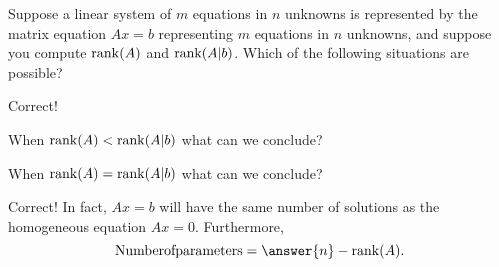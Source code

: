\documentclass{ximera}
\begin{document}
\begin{question}
Suppose a linear system of $m$ equations in $n$ unknowns is represented by the matrix equation $Ax=b$ representing $m$ equations in $n$ unknowns, 
and suppose you compute ${\rm rank}(A)$ and ${\rm rank}(A|b)$.  Which of the following situations are possible? 
\begin{selectAll}
\end{selectAll}

\begin{question}
Correct!  

When ${\rm rank}(A) < {\rm rank}(A|b)$ what can we conclude? 
\begin{multipleChoice}
\end{multipleChoice}

When ${\rm rank}(A) = {\rm rank}(A|b)$ what can we conclude? 
\begin{multipleChoice}

\begin{question}
Correct!  In fact, $Ax=b$ will have the same number of solutions as the homogeneous equation $Ax=0$.  
Furthermore, 
\[
{\rm Number of parameters }= \answer{n} - {\rm rank}(A). 
\]
\end{question}
\end{multipleChoice}
\end{question}
\end{question}
\end{document}
